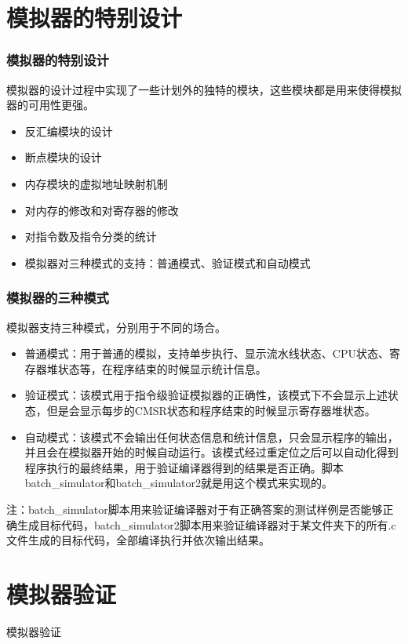 \documentclass[CJK]{beamer}
\begin{document}
\begin{CJK}{UTF8}{gbsn}
\section{模拟器的特别设计}
\begin{frame}
	\frametitle{模拟器的特别设计}
	模拟器的设计过程中实现了一些计划外的独特的模块，这些模块都是用来使得模拟器的可用性更强。
	\begin{itemize}
		\item 反汇编模块的设计
		\item 断点模块的设计
		\item 内存模块的虚拟地址映射机制
		\item 对内存的修改和对寄存器的修改
		\item 对指令数及指令分类的统计
		\item 模拟器对三种模式的支持：普通模式、验证模式和自动模式
	\end{itemize}
\end{frame}

\begin{frame}
	\frametitle{模拟器的三种模式}
	模拟器支持三种模式，分别用于不同的场合。
	\begin{itemize}
		\item 普通模式：用于普通的模拟，支持单步执行、显示流水线状态、CPU状态、寄存器堆状态等，在程序结束的时候显示统计信息。
		\item 验证模式：该模式用于指令级验证模拟器的正确性，该模式下不会显示上述状态，但是会显示每步的CMSR状态和程序结束的时候显示寄存器堆状态。
		\item 自动模式：该模式不会输出任何状态信息和统计信息，只会显示程序的输出，并且会在模拟器开始的时候自动运行。该模式经过重定位之后可以自动化得到程序执行的最终结果，用于验证编译器得到的结果是否正确。脚本batch\_simulator和batch\_simulator2就是用这个模式来实现的。
	\end{itemize}
	注：batch\_simulator脚本用来验证编译器对于有正确答案的测试样例是否能够正确生成目标代码，batch\_simulator2脚本用来验证编译器对于某文件夹下的所有.c文件生成的目标代码，全部编译执行并依次输出结果。
\end{frame}

\section{模拟器验证}
\begin{frame}
	\huge{模拟器验证}
\end{frame}


\end{CJK}
\end{document}
